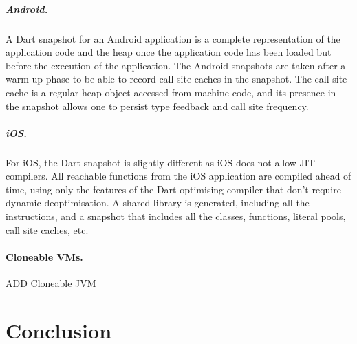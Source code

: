\documentclass[a4paper,12pt,twoside]{../includes/ThesisStyle}
\begin{document}
\subparagraph{Android.} A Dart snapshot for an Android application is a complete representation of the application code and the heap once the application code has been loaded but before the execution of the application. The Android snapshots are taken after a warm-up phase to be able to record call site caches in the snapshot. The call site cache is a regular heap object accessed from machine code, and its presence in the snapshot allows one to persist type feedback and call site frequency.

\subparagraph{iOS.} For iOS, the Dart snapshot is slightly different as iOS does not allow JIT compilers. All reachable functions from the iOS application are compiled ahead of time, using only the features of the Dart optimising compiler that don't require dynamic deoptimisation. A shared library is generated, including all the instructions, and a snapshot that includes all the classes, functions, literal pools, call site caches, etc.

\paragraph{Cloneable VMs.}

ADD
Cloneable JVM
\cite{Kawa07a}








\section*{Conclusion} 
\end{document}
